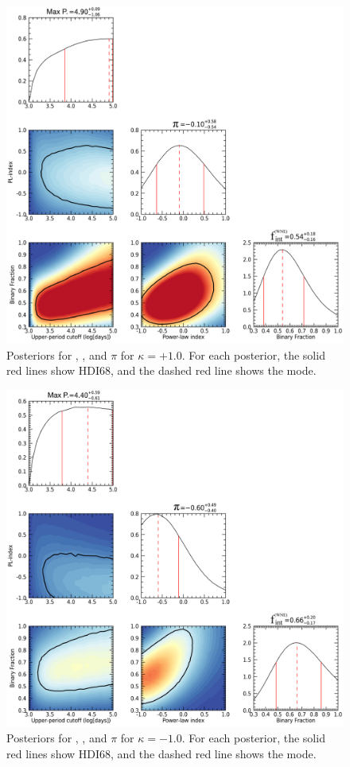 \begin{figure}
    \centering
    \includegraphics[width=\hsize]{chapters/WNE/image/Kappa_plus1.png}
    \caption{Posteriors for \logPmax{}, \fintWNE{} , and $\pi$ for $\kappa = +1.0$. For each posterior, the solid red lines show HDI68, and the dashed red line shows the mode.}
    \label{fig:kappa_plus1}
\end{figure}


\begin{figure}
    \centering
    \includegraphics[width=\hsize]{chapters/WNE/image/Kappa_minus1.png}
    \caption{Posteriors for \logPmax{}, \fintWNE{} , and $\pi$ for $\kappa = -1.0$. For each posterior, the solid red lines show HDI68, and the dashed red line shows the mode.}
    \label{fig:kappa_minus1}
\end{figure}


